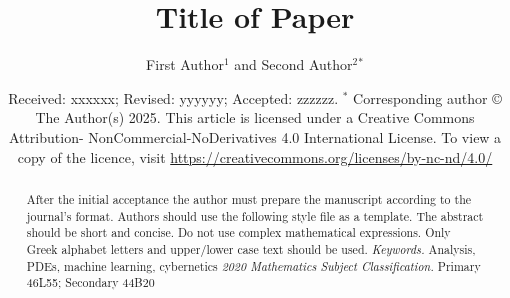 \documentclass[12pt, reqno]{amsart}
\theoremstyle{definition}
\theoremstyle{remark}
\numberwithin{equation}{section}
\begin{document}
\setcounter{page}{1}


\centerline{}

\centerline{}



\title[Short Title]{Title of Paper}

\author[F. Author, S. Author]{First Author$^1$ and Second Author$^2$$^{*}$}

\address{$^{1}$ Department of Mathematics, University of California, San Diego, USA.}
\email{\textcolor[rgb]{0.00,0.00,0.84}{first@amcs.org}}

\address{$^{2}$ Department of Computer Science, Moscow State University, Moscow, Russia}
\email{\textcolor[rgb]{0.00,0.00,0.84}{second@ieee.org}}



\date{Received: xxxxxx; Revised: yyyyyy; Accepted: zzzzzz.
\newline \indent $^{*}$ Corresponding author
\newline \indent © The Author(s) 2025. This article is licensed under a Creative Commons Attribution-
\newline \indent NonCommercial-NoDerivatives 4.0
International License. To view a copy of the licence, visit 
\newline \indent \url{https://creativecommons.org/licenses/by-nc-nd/4.0/}}


\begin{abstract}
After the initial acceptance the author must prepare the manuscript according to the journal's format. Authors should use the following style file as a template. The abstract should be short and concise. Do not use complex mathematical expressions. Only Greek alphabet letters and upper/lower case text should be used.
\newline
\newline
\noindent \textit{Keywords.} Analysis, PDEs, machine learning, cybernetics
\newline
\noindent \textit{2020 Mathematics Subject Classification.} Primary 46L55; Secondary 44B20
\end{abstract} \maketitle
\end{document}
